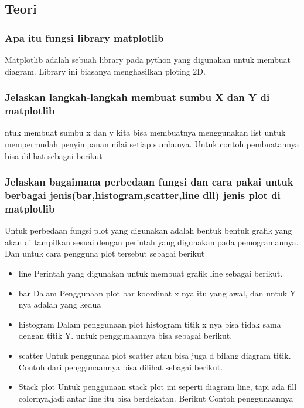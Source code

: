 \subsection{Teori}
\subsubsection{Apa itu fungsi library matplotlib}
\hfill \break
Matplotlib adalah sebuah library pada python yang digunakan untuk membuat diagram. Library ini biasanya menghasilkan ploting 2D.
\subsubsection{Jelaskan langkah-langkah membuat sumbu X dan Y di matplotlib}
\hfill \break
ntuk membuat sumbu x dan y kita bisa membuatnya menggunakan list untuk mempermudah penyimpanan nilai setiap sumbunya.
Untuk contoh pembuatannya bisa dilihat sebagai berikut

\subsubsection{Jelaskan bagaimana perbedaan fungsi dan cara pakai untuk berbagai jenis(bar,histogram,scatter,line dll) jenis plot di matplotlib}
\hfill \break
Untuk perbedaan fungsi plot yang digunakan adalah bentuk bentuk grafik yang akan di tampilkan sesuai dengan perintah yang digunakan pada pemogramannya.
Dan untuk cara pengguna plot tersebut sebagai berikut
\begin{itemize}
    \item line
    Perintah yang digunakan untuk membuat grafik line sebagai berikut.
    
    \item bar
    Dalam Penggunaan plot bar koordinat x nya itu yang awal, dan untuk Y nya adalah yang kedua
    
    \item histogram
    Dalam penggunaan plot histogram titik x nya bisa tidak sama dengan titik Y.
    untuk penggunaannya bisa sebagai berikut.
    
    \item scatter
    Untuk penggunaa plot scatter atau bisa juga d bilang diagram titik.
    Contoh dari penggunaannya bisa dilihat sebagai berikut.
    
    \item Stack plot
    Untuk penggunaan stack plot ini seperti diagram line, tapi ada fill colornya,jadi antar line itu bisa berdekatan.
    Berikut Contoh penggunaannya
    
\end{itemize}

